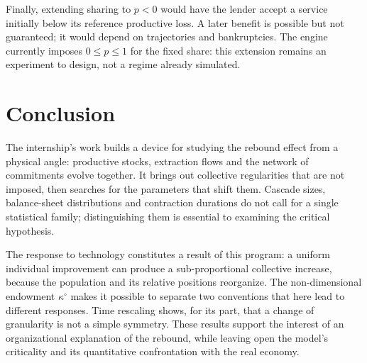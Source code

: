Finally, extending sharing to $p<0$ would have the lender accept a
service initially below its reference productive loss. A later benefit
is possible but not guaranteed; it would depend on trajectories and
bankruptcies. The engine currently imposes $0\le p\le1$ for the fixed
share: this extension remains an experiment to design, not a regime
already simulated.

\section{Conclusion}
The internship's work builds a device for studying the rebound effect
from a physical angle: productive stocks, extraction flows and the
network of commitments evolve together. It brings out collective
regularities that are not imposed, then searches for the parameters
that shift them. Cascade sizes, balance-sheet distributions and
contraction durations do not call for a single statistical family;
distinguishing them is essential to examining the critical hypothesis.

The response to technology constitutes a result of this program: a
uniform individual improvement can produce a sub-proportional
collective increase, because the population and its relative positions
reorganize. The non-dimensional endowment $\kappa^\circ$ makes it
possible to separate two conventions that here lead to different
responses. Time rescaling shows, for its part, that a change of
granularity is not a simple symmetry. These results support the
interest of an organizational explanation of the rebound, while leaving
open the model's criticality and its quantitative confrontation with
the real economy.
